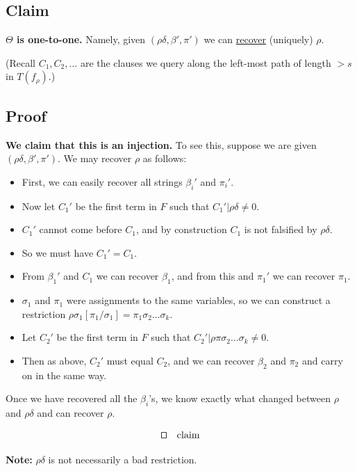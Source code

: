 \subsection*{Claim}
\noindent
\textbf{\(\Theta\) is one-to-one.} Namely, given \( (\rho\delta, \beta', \pi') \) we can \underline{recover} (uniquely) \( \rho \).

\noindent
(Recall \( C_1, C_2, \dots \) are the clauses we query along the left-most path of length \( >s \) in \( T(f_{\rho}) \).)

\subsection*{Proof}
\noindent
\textbf{We claim that this is an injection.} To see this, suppose we are given \( (\rho\delta, \beta', \pi') \). We may recover \( \rho \) as follows:

\begin{itemize}
    \item First, we can easily recover all strings \( \beta_i' \) and \( \pi_i' \).
    \item Now let \( C_1' \) be the first term in \( F \) such that \( C_1' | \rho\delta \neq 0 \).
    \item \( C_1' \) cannot come before \( C_1 \), and by construction \( C_1 \) is not falsified by \( \rho\delta \).
    \item So we must have \( C_1' = C_1 \).
    \item From \( \beta_1' \) and \( C_1 \) we can recover \( \beta_1 \), and from this and \( \pi_1' \) we can recover \( \pi_1 \).
    \item \( \sigma_1 \) and \( \pi_1 \) were assignments to the same variables, so we can construct a restriction \( \rho\sigma_1[\pi_1/\sigma_1] = \pi_1\sigma_2 \dots \sigma_k \).
    \item Let \( C_2' \) be the first term in \( F \) such that \( C_2' | \rho\pi\sigma_2 \dots \sigma_k \neq 0 \).
    \item Then as above, \( C_2' \) must equal \( C_2 \), and we can recover \( \beta_2 \) and \( \pi_2 \) and carry on in the same way.
\end{itemize}

\noindent
Once we have recovered all the \( \beta_i \)'s, we know exactly what changed between \( \rho \) and \( \rho\delta \) and can recover \( \rho \).

\[
\qed \quad \text{claim}
\]

\noindent
\textbf{Note:} \( \rho\delta \) is not necessarily a bad restriction.

